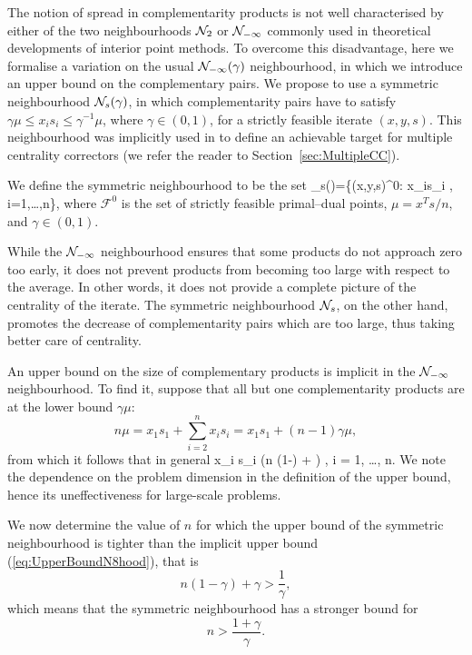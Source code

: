 The notion of spread in complementarity products
is not well characterised by either 
of the two neighbourhoods $\mathcal{N}_2$ or $\mathcal{N}_{-\infty}$ commonly used 
in theoretical developments of interior point methods.
To overcome this disadvantage, here we formalise a variation 
on the usual $\mathcal{N}_{-\infty}(\gamma)$ neighbourhood, 
in which we introduce an upper bound on the complementary pairs. 
We propose to use a symmetric neighbourhood $\mathcal{N}_s(\gamma)$,
in which complementarity pairs have to satisfy 
$\gamma \mu \leq x_i s_i \leq \gamma^{-1} \mu$, where $\gamma \in (0,1)$, 
for a strictly feasible iterate $(x,y,s)$.
This neighbourhood was implicitly used in \cite{Gondzio96}
to define an achievable target for multiple centrality correctors
(we refer the reader to Section~\ref{sec:MultipleCC}).


We define the symmetric neighbourhood to be the set
\be  \label{eq:SymmetricNeighbourhood}
  \Nhood_s(\gamma)=\{(x,y,s)\in {}^0: 
  \gamma\mu\le x_is_i \le {}\mu, \; i=1,\ldots,n\},
\ee
where $\mathcal{F}^0$ 
is the set of strictly feasible primal--dual points,
$\mu = x^Ts/n$, and $\gamma \in (0,1)$.

While the $\mathcal{N}_{-\infty}$ neighbourhood ensures that some 
products do not approach zero too early, it does not prevent products
from becoming too large with respect to the average.
In other words, it does not provide a complete 
picture of the centrality of the iterate. The symmetric 
neighbourhood $\mathcal{N}_s$, on the other hand, promotes 
the decrease of complementarity pairs which are too large, thus taking 
better care of centrality.

An upper bound on the size of complementary products
is implicit in the $\mathcal{N}_{-\infty}$ neighbourhood. To find it,
suppose that all but one complementarity products are at the lower bound
$\gamma\mu$:
\[
  n\mu = x_1s_1 + \sum_{i=2}^n x_is_i = x_1 s_1 + (n-1)\gamma\mu,
\]
from which it follows that in general
\be  \label{eq:UpperBoundN8hood}
  x_i s_i \le (n (1-\gamma) + \gamma) \mu, \quad i = 1, \ldots, n.
\ee
We note the dependence on the problem dimension in the definition of the
upper bound, hence its uneffectiveness for large-scale problems.

We now determine the value of $n$ for which the upper bound of
the symmetric neighbourhood is tighter than the implicit upper bound
(\ref{eq:UpperBoundN8hood}), that is
\[
  n(1-\gamma) + \gamma > \frac{1}{\gamma},
\]
which means that the symmetric neighbourhood has a stronger bound
for
\[
  n > \frac{1+\gamma}{\gamma}.
\]

